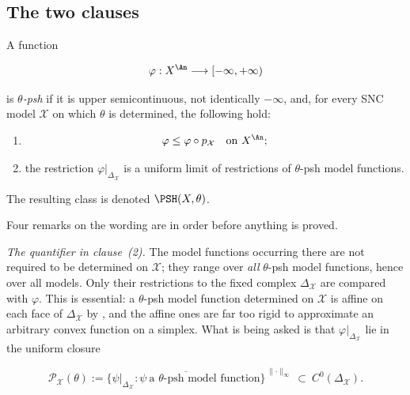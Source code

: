 \subsection{The two clauses}
\label{sec:ch21-two-clauses}

\begin{definition}\label{def:ch21-bfj-psh}
A function

\[
             \varphi:X^{\An}\longrightarrow[-\infty,+\infty)
\]

is \emph{\(\theta\)-psh} if it is upper semicontinuous, not identically
\(-\infty\), and, for every SNC model \(\mathcal X\) on which \(\theta\) is
determined, the following hold:

\begin{enumerate}
\item
\begin{equation}
\label{eq:ch21-retraction-inequality}
                    \varphi\leq\varphi\circ p_{\mathcal X}
                    \quad\text{on }X^{\An};
\end{equation}

\item the restriction \(\varphi|_{\Delta_{\mathcal X}}\) is a uniform limit
of restrictions of \(\theta\)-psh model functions.
\end{enumerate}

The resulting class is denoted \(\PSH(X,\theta)\).
\end{definition}

Four remarks on the wording are in order before anything is proved.

\emph{The quantifier in clause~(2).}  The model functions occurring there
are not required to be determined on \(\mathcal X\); they range over
\emph{all} \(\theta\)-psh model functions, hence over all models.  Only
their restrictions to the fixed complex \(\Delta_{\mathcal X}\) are compared
with \(\varphi\).  This is essential: a \(\theta\)-psh model function
determined on \(\mathcal X\) is affine on each face of
\(\Delta_{\mathcal X}\) by , and the affine
ones are far too rigid to approximate an arbitrary convex function on a
simplex.  What is being asked is that
\(\varphi|_{\Delta_{\mathcal X}}\) lie in the uniform closure

\begin{equation}
\label{eq:ch21-skeletal-closure}
 \mathcal P_{\mathcal X}(\theta)
 :=\overline{
   \bigl\{\psi|_{\Delta_{\mathcal X}}:
   \psi\ \text{a \(\theta\)-psh model function}\bigr\}
   }^{\,\lVert\cdot\rVert_\infty}
   \ \subset\ C^0(\Delta_{\mathcal X}).
\end{equation}

